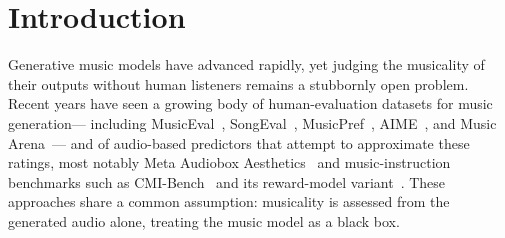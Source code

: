 \documentclass{article}
\begin{document}
\begin{abstract}

\end{abstract}

\section{Introduction}\label{sec:introduction}

Generative music models have advanced rapidly,
yet judging the musicality of their outputs without human listeners
remains a stubbornly open problem.
Recent years have seen a growing body of human-evaluation datasets
for music generation---%
including MusicEval~\cite{liu2025musiceval},
SongEval~\cite{yao2025songeval},
MusicPref~\cite{huang2025musicpref},
AIME~\cite{grotschla2025aime},
and Music Arena~\cite{kim2025musicarena}---%
and of audio-based predictors that attempt to approximate these ratings,
most notably Meta Audiobox Aesthetics~\cite{tjandra2025audiobox}
and music-instruction benchmarks such as CMI-Bench~\cite{ma2025cmibench}
and its reward-model variant~\cite{ma2026cmireward}.
These approaches share a common assumption:
musicality is assessed from the generated audio alone,
treating the music model as a black box.
\end{document}
